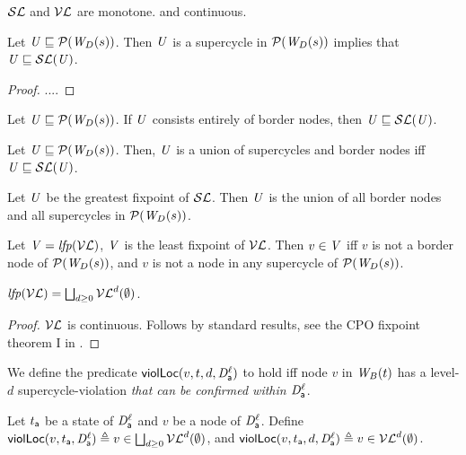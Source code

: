 \bp \label{prop:monotoneL}
$\lSFs$ and $\lVFs$ are monotone. and continuous.
\ep


\bp \label{prop:supercycleLocGFP}
Let $\UU \subg \lwfgS{B}{s}{\DS}$. Then $\UU$ is a supercycle in $\lwfgS{B}{s}{\DS}$ implies that $\UU \subg \lSF{\UU}$.
\ep
%
\begin{proof}
....%
\end{proof}


\bp \label{prop:borderLocGFP}
Let $\UU \subg \lwfgS{B}{s}{\DS}$. If $\UU$ consists entirely of border nodes, then $\UU \subg \lSF{\UU}$.
\ep


\bp \label{prop:locGFP}
Let $\UU \subg \lwfgS{B}{s}{\DS}$. Then, $\UU$ is a union of supercycles and border nodes iff $\UU \subg \lSF{\UU}$.
\ep

\bp \label{prop:GFPisLargestLocSC}
Let $\UU$ be the greatest fixpoint of $\lSFs$. Then $\UU$ is the union of all border nodes and all supercycles in 
$\lwfgS{B}{s}{\DS}$.
\ep

\bp \label{prop:LFPisLocScViolations}
Let  $\VS= \lfp{\lVFs}$, \ie $\VS$ is the least fixpoint of $\lVFs$. Then $v \in \VS$ iff $v$ is not a border node of 
$\lwfgS{B}{s}{\DS}$, and $v$ is not a node in any supercycle of $\lwfgS{B}{s}{\DS}$.
\ep


\bp \label{prop:computeLocLFP}
$\lfp{\lVFs} = \JOIN_{d \ge 0} \lVFs^{d} (\ewfg)$.
\ep
\begin{proof}
$\lVFs$ is continuous. Follows by standard results, \eg see the CPO fixpoint theorem I in 
\cite{DP02}.
\end{proof}










We define the predicate $\lviol{v}{d}{t}{\act}{\l}$ to hold iff node $v$ in $\wfg{B}{t}$ has a level-$d$ supercycle-violation
\emph{that can be confirmed within $\dsk{\act}{\l}$}.

\label{def:supercycle.violation.local}
Let $t_\act$ be a state of $\dsk{\act}{\l}$ and $v$ be a node of $\dsk{\act}{\l}$.
Define 
$\scVL{v}{t_\act}{\act}{\l} \df v \in \JOIN_{d \ge 0} \lVFs^{d} (\ewfg)$, and 
$\lviol{v}{d}{t_\act}{\act}{\l} \df v \in \lVFs^{d} (\ewfg)$.
\ed




